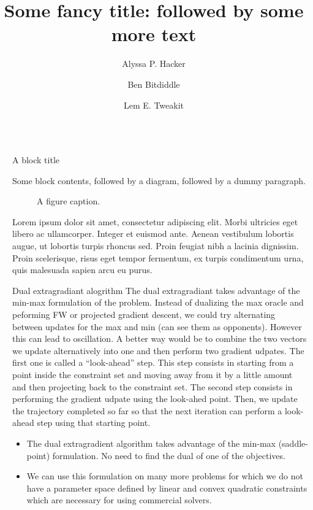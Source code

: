 \documentclass[final]{beamer}
\title{Some fancy title: followed by some more text}
\author{Alyssa P. Hacker \inst{1} \and Ben Bitdiddle \inst{2} \and Lem E. Tweakit \inst{2}}
\institute[shortinst]{\inst{1} Some Institute \samelineand \inst{2} Another Institute}
\newlength{\sepwidth}
\newlength{\colwidth}
\newcommand{\separatorcolumn}{\begin{column}{\sepwidth}\end{column}}
\begin{document}
\begin{frame}[t]
\begin{columns}[t]
\separatorcolumn

\begin{column}{\colwidth}

  \begin{block}{A block title}

    Some block contents, followed by a diagram, followed by a dummy paragraph.

    \begin{figure}
      \centering
      \caption{A figure caption.}
    \end{figure}

    Lorem ipsum dolor sit amet, consectetur adipiscing elit. Morbi ultricies
    eget libero ac ullamcorper. Integer et euismod ante. Aenean vestibulum
    lobortis augue, ut lobortis turpis rhoncus sed. Proin feugiat nibh a
    lacinia dignissim. Proin scelerisque, risus eget tempor fermentum, ex
    turpis condimentum urna, quis malesuada sapien arcu eu purus.

  \end{block}


  \begin{block}{Dual extragradiant alogrithm}
    The dual extragradiant takes advantage of the min-max formulation of the problem. Instead of dualizing the max oracle and peforming FW or projected gradient descent, we could try alternating between updates for the max and min (can see them as opponents).
    However this can lead to oscillation. 
    A better way would be to combine the two vectors we update alternatively into one and then perform two gradient udpates. The
    first one is called a ``look-ahead'' step. This step consists in starting from a point inside the constraint set and moving away
    from it  by a little amount and then projecting back to the constraint set. The second step consists in performing the gradient
    udpate using the look-ahed point. Then, we update the trajectory completed so far so that the next iteration can perform a  look-ahead
    step using that starting point.
    \begin{itemize}
      \item The dual extragradient algorithm takes advantage of the min-max (saddle-point) formulation. No need to find the dual of
	one of the objectives.
      \item We can use this formulation on many more problems for which we do not have a parameter space defined
	by linear and convex quadratic constraints which are necessary for using commercial solvers.
    \end{itemize}


\end{block}
\end{column}
\end{columns}
\end{frame}
\end{document}
